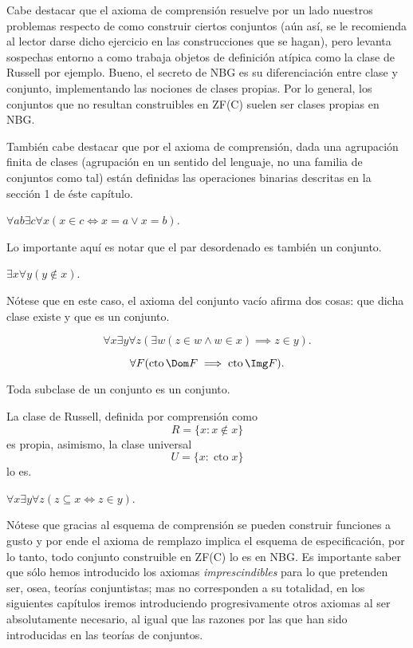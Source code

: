 \documentclass[11pt,a4paper]{book}
\DeclareMathOperator{\cto}{cto}
\begin{document}
Cabe destacar que el axioma de comprensión resuelve por un lado nuestros problemas respecto de como construir ciertos conjuntos (aún así, se le recomienda al lector darse dicho ejercicio en las construcciones que se hagan), pero levanta sospechas entorno a como trabaja objetos de definición atípica como la clase de Russell por ejemplo. Bueno, el secreto de NBG es su diferenciación entre clase y conjunto, implementando las nociones de clases propias. Por lo general, los conjuntos que no resultan construibles en ZF(C) suelen ser clases propias en NBG.

También cabe destacar que por el axioma de comprensión, dada una agrupación finita de clases (agrupación en un sentido del lenguaje, no una familia de conjuntos como tal) están definidas las operaciones binarias descritas en la sección 1 de éste capítulo.
\begin{axiom}
	$\forall ab\exists c\forall x(x\in c\iff x=a\vee x=b)$.
\end{axiom}
Lo importante aquí es notar que el par desordenado es también un conjunto.
\begin{axiom}
	$\exists x\forall y(y\notin x)$.
\end{axiom}
Nótese que en este caso, el axioma del conjunto vacío afirma dos cosas: que dicha clase existe y que es un conjunto.
\begin{axiom}
	$$\forall x\exists y\forall z(\exists w(z\in w\wedge w\in x)\implies z\in y).$$
\end{axiom}
\begin{axiom}
	$$\forall F(\cto\Dom F\implies\cto\Img F).$$
\end{axiom}
\begin{thm}
	Toda subclase de un conjunto es un conjunto.
\end{thm}
\begin{thm}
	La clase de Russell, definida por comprensión como
	$$R=\{x:x\notin x\}$$
	es propia, asimismo, la clase universal
	$$U=\{x:\cto x\}$$
	lo es.
\end{thm}
\begin{axiom}
	$\forall x\exists y\forall z(z\subseteq x\iff z\in y)$.
\end{axiom}
Nótese que gracias al esquema de comprensión se pueden construir funciones a gusto y por ende el axioma de remplazo implica el esquema de especificación, por lo tanto, todo conjunto construible en ZF(C) lo es en NBG. Es importante saber que sólo hemos introducido los axiomas \textit{imprescindibles} para lo que pretenden ser, osea, teorías conjuntistas; mas no corresponden a su totalidad, en los siguientes capítulos iremos introduciendo progresivamente otros axiomas al ser absolutamente necesario, al igual que las razones por las que han sido introducidas en las teorías de conjuntos.
\end{document}
